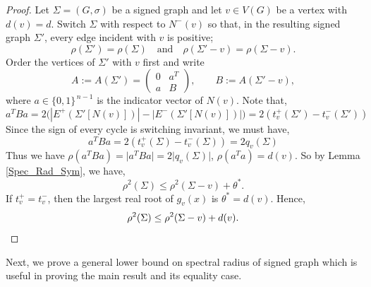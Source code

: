 \documentclass[12pt]{article}
\theoremstyle{plain}
\numberwithin{equation}{section}
\begin{document}
	\begin{proof}
		Let $\Sigma=(G,\sigma)$ be a signed graph and let $v\in V(G)$ be a
		vertex with $d(v)=d$. Switch $\Sigma$ with respect to
		$N^{-}(v)$ so that, in the resulting signed graph $\Sigma'$, every
		edge incident with $v$ is positive;
		\[
		\rho(\Sigma')=\rho(\Sigma)
		\quad\text{and}\quad
		\rho(\Sigma'-v)=\rho(\Sigma-v).
		\]
		Order the vertices of $\Sigma'$ with $v$ first and write
		\[
		A:=A(\Sigma')
		=
		\begin{pmatrix}
			0 & a^{T}\\
			a & B
		\end{pmatrix},
		\qquad
		B:=A(\Sigma'-v),
		\]
		where $a\in\{0,1\}^{\,n-1}$ is the indicator vector of $N(v)$.
		Note that,\\
		\[
		a^{T}Ba
		=2\bigl(|E^{+}(\Sigma'[N(v)])|-|E^{-}(\Sigma'[N(v)])|\bigr)=2(t_v^+(\Sigma')-t_v^-(\Sigma'))
		\] 
		Since the sign of every cycle is switching invariant, we must have,
		\[
		a^{T}Ba
		=2(t_v^+(\Sigma)-t_v^-(\Sigma))=2q_v(\Sigma)
		\] 
		Thus we have $\rho(a^TBa)= \vert a^TBa\vert=2\vert q_v(\Sigma) \vert$, $\rho(a^Ta)=d(v)$. So by Lemma \ref{Spec_Rad_Sym}, we have, \[
		\rho^{2}(\Sigma)\leq \rho^{2}(\Sigma-v)+\theta^{*}.
		\]
		If $t_v^+=t_v^-$, then the largest real root of
		$g_v(x)$ is $\theta^{*}=d(v)$. Hence,
		\[
		\rho^{2}(\Sigma)
		\leq \rho^{2}(\Sigma-v)+d(v). \qedhere
		\]
	\end{proof}
	
	Next, we prove a general lower bound on spectral radius of signed graph which is useful in proving the main result and its equality case. 
	
\end{document}
